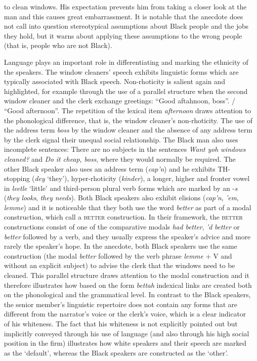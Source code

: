 to clean windows. His expectation prevents him from taking a closer look at the man and this causes great embarrassment. It is notable that the anecdote does not call into question stereotypical assumptions about Black people and the jobs they hold, but it warns about applying these assumptions to the wrong people (that is, people who are not Black).

Language plays an important role in differentiating and marking the ethnicity of the speakers. The window cleaners’ speech exhibits linguistic forms which are typically associated with Black speech. Non-rhoticity is salient again and highlighted, for example through the use of a parallel structure when the second window cleaner and the clerk exchange greetings: “Good aftahnoon, boss”. / “Good afternoon”. The repetition of the lexical item \emph{afternoon} draws attention to the phonological difference, that is, the window cleaner’s non-rhoticity. The use of the address term \emph{boss} by the window cleaner and the absence of any address term by the clerk signal their unequal social relationship. The Black man also uses incomplete sentences: There are no subjects in the sentences \emph{Want yoh windows cleaned?} and \emph{Do it cheap, boss}, where they would normally be required. The other Black speaker also uses an address term (\emph{cap’n}) and he exhibits TH-stopping (\emph{dey} ‘they’), hyper-rhoticity (\emph{kinder}), a longer, higher and fronter vowel in \emph{leetle} ‘little’ and third-person plural verb forms which are marked by an -\emph{s} (\emph{they looks}, \emph{they needs}). Both Black speakers also exhibit elisions (\emph{cap’n}, \emph{’em}, \emph{lemme}) and it is noticeable that they both use the word \emph{better} as part of a modal construction, which \citet{vanderAuwera2013} call a \textsc{better} construction. In their framework, the \textsc{better} constructions consist of one of the comparative modals \emph{had better}, \emph{’d better} or \emph{better} followed by a verb, and they usually express the speaker’s advice and more rarely the speaker’s hope. In the anecdote, both Black speakers use the same construction (the modal \emph{better} followed by the verb phrase \emph{lemme} + V and without an explicit subject) to advise the clerk that the windows need to be cleaned. This parallel structure draws attention to the modal construction and it therefore illustrates how based on the form \emph{bettah} indexical links are created both on the phonological and the grammatical level. In contrast to the Black speakers, the senior member’s linguistic repertoire does not contain any forms that are different from the narrator’s voice or the clerk’s voice, which is a clear indicator of his whiteness. The fact that his whiteness is not explicitly pointed out but implicitly conveyed through his use of language (and also through his high social position in the firm) illustrates how white speakers and their speech are marked as the ‘default’, whereas the Black speakers are constructed as the ‘other’.

